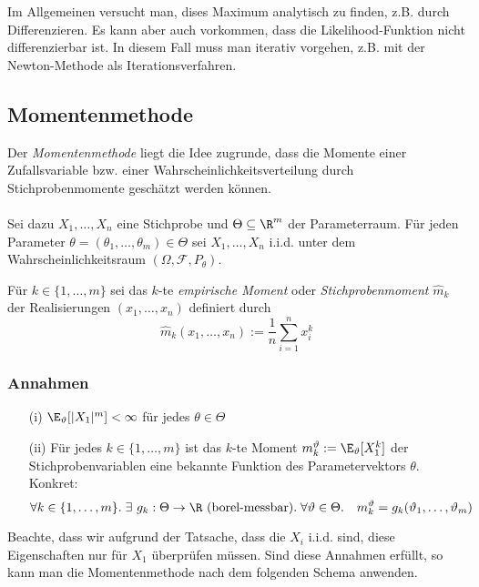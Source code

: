 Im Allgemeinen versucht man, dises Maximum analytisch zu finden, z.B. durch Differenzieren. Es kann aber auch vorkommen, dass die Likelihood-Funktion nicht differenzierbar ist. In diesem Fall muss man iterativ vorgehen, z.B. mit der Newton-Methode als Iterationsverfahren.

\subsection{Momentenmethode}
Der \textit{Momentenmethode} liegt die Idee zugrunde, dass die Momente einer Zufallsvariable bzw. einer Wahrscheinlichkeitsverteilung durch Stichprobenmomente geschätzt werden können. \\\\Sei dazu $X_1,\dots,X_n$ eine Stichprobe und $\Theta \subseteq \R^m$ der Parameterraum. Für jeden Parameter $\theta = (\theta_1,\dots,\theta_m) \in \Theta$ sei $X_1,\dots,X_n$ i.i.d. unter dem Wahrscheinlichkeitsraum $(\Omega, \mathcal{F}, P_\theta)$.

\begin{definition}
Für $k\in \{1,\dots,m\}$ sei das $k$-te \textit{empirische Moment} oder \textit{Stichprobenmoment} $\widehat{m}_k$ der Realisierungen $(x_1,\dots,x_n)$ definiert durch
$$ \widehat{m}_k (x_1, \dots, x_n) := \frac{1}{n} \sum_{i=1}^n x_i^k $$
\end{definition}

\subsubsection*{Annahmen}
\begin{itemize}
\item[(i)] $\E_\theta [|X_1|^m] < \infty$ für jedes $\theta \in \Theta$
\item[(ii)] Für jedes $k \in \{1,\dots,m\}$ ist das $k$-te Moment $m_k^\theta := \E_\theta [X_1^k]$ der Stichprobenvariablen eine bekannte Funktion des Parametervektors $\theta$. Konkret:
$$ \forall k\in \{1,\dots,m\}. \; \exists \ g_k : \Theta \to \R \mbox{ (borel-messbar)}. \; \forall \theta \in \Theta. \quad m_k^\theta = g_k(\theta_1,\dots,\theta_m)$$ 
\end{itemize}
Beachte, dass wir aufgrund der Tatsache, dass die $X_i$ i.i.d. sind, diese Eigenschaften nur für $X_1$ überprüfen müssen. Sind diese Annahmen erfüllt, so kann man die Momentenmethode nach dem folgenden Schema anwenden.
